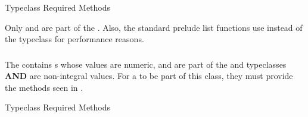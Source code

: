 \begin{listing}[h!tbp]
\caption{ Typeclass Required Methods}
\label{lst:Integral_Typeclass_Methods}
\end{listing}

Only  and  are part of the  .
Also, the standard prelude list functions use  instead of the  typeclass for performance reasons.

\subsubsection{\texorpdfstring{}{\texttt{Fractional}}}\label{subsubsec:Fractional_Typeclass}
The   contains s whose values are numeric, and are part of the  and  typeclasses \textbf{AND} are non-integral values.
For a  to be part of this class, they must provide the methods seen in .

\begin{listing}[h!tbp]
\caption{ Typeclass Required Methods}
\label{lst:Fractional_Typeclass_Methods}
\end{listing}


